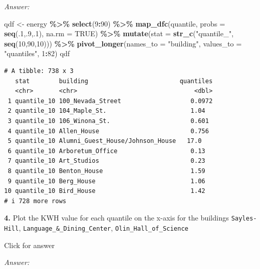 \documentclass[
]{book}
\newenvironment{Shaded}{\begin{snugshade}}{\end{snugshade}}
\newcommand{\AttributeTok}[1]{\textcolor[rgb]{0.13,0.29,0.53}{#1}}
\newcommand{\ConstantTok}[1]{\textcolor[rgb]{0.56,0.35,0.01}{#1}}
\newcommand{\DecValTok}[1]{\textcolor[rgb]{0.00,0.00,0.81}{#1}}
\newcommand{\FunctionTok}[1]{\textcolor[rgb]{0.13,0.29,0.53}{\textbf{#1}}}
\newcommand{\NormalTok}[1]{#1}
\newcommand{\OtherTok}[1]{\textcolor[rgb]{0.56,0.35,0.01}{#1}}
\newcommand{\SpecialCharTok}[1]{\textcolor[rgb]{0.81,0.36,0.00}{\textbf{#1}}}
\newcommand{\StringTok}[1]{\textcolor[rgb]{0.31,0.60,0.02}{#1}}
\begin{document}
\emph{Answer:}

\begin{Shaded}
\begin{Highlighting}[]
\NormalTok{qdf }\OtherTok{\textless{}{-}}\NormalTok{ energy }\SpecialCharTok{\%\textgreater{}\%} \FunctionTok{select}\NormalTok{(}\DecValTok{9}\SpecialCharTok{:}\DecValTok{90}\NormalTok{) }\SpecialCharTok{\%\textgreater{}\%}
  \FunctionTok{map\_dfc}\NormalTok{(quantile, }\AttributeTok{probs =} \FunctionTok{seq}\NormalTok{(.}\DecValTok{1}\NormalTok{,.}\DecValTok{9}\NormalTok{,.}\DecValTok{1}\NormalTok{), }\AttributeTok{na.rm =} \ConstantTok{TRUE}\NormalTok{) }\SpecialCharTok{\%\textgreater{}\%}  
  \FunctionTok{mutate}\NormalTok{(}\AttributeTok{stat =} \FunctionTok{str\_c}\NormalTok{(}\StringTok{"quantile\_"}\NormalTok{, }\FunctionTok{seq}\NormalTok{(}\DecValTok{10}\NormalTok{,}\DecValTok{90}\NormalTok{,}\DecValTok{10}\NormalTok{))) }\SpecialCharTok{\%\textgreater{}\%}   
  \FunctionTok{pivot\_longer}\NormalTok{(}\AttributeTok{names\_to =} \StringTok{"building"}\NormalTok{, }\AttributeTok{values\_to =} \StringTok{"quantiles"}\NormalTok{, }\DecValTok{1}\SpecialCharTok{:}\DecValTok{82}\NormalTok{)}
\NormalTok{qdf}
\end{Highlighting}
\end{Shaded}

\begin{verbatim}
# A tibble: 738 x 3
   stat        building                         quantiles
   <chr>       <chr>                                <dbl>
 1 quantile_10 100_Nevada_Street                   0.0972
 2 quantile_10 104_Maple_St.                       1.04  
 3 quantile_10 106_Winona_St.                      0.601 
 4 quantile_10 Allen_House                         0.756 
 5 quantile_10 Alumni_Guest_House/Johnson_House   17.0   
 6 quantile_10 Arboretum_Office                    0.13  
 7 quantile_10 Art_Studios                         0.23  
 8 quantile_10 Benton_House                        1.59  
 9 quantile_10 Berg_House                          1.06  
10 quantile_10 Bird_House                          1.42  
# i 728 more rows
\end{verbatim}

\textbf{4.} Plot the KWH value for each quantile on the x-axis for the buildings \texttt{Sayles-Hill}, \texttt{Language\_\&\_Dining\_Center}, \texttt{Olin\_Hall\_of\_Science}

Click for answer

\emph{Answer:}
\end{document}
